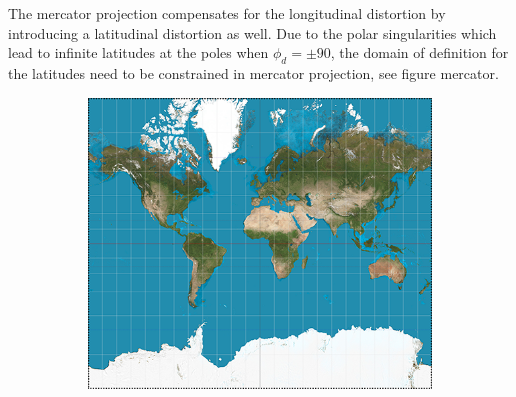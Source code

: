 The mercator projection compensates for the longitudinal distortion by introducing a latitudinal distortion as well. Due to the polar singularities which lead to infinite latitudes at the poles when $\phi_d = \pm 90$, the domain of definition for the latitudes need to be constrained in mercator projection, see figure mercator.

\begin{figure}[htbp]
    \centering
    \begin{subfigure}[bt]{0.4\textwidth}
        \includegraphics[width=\textwidth]{figures/developable_projected/mercator.png}
    \end{subfigure}
    \qquad
    \begin{subfigure}[bt]{0.15\textwidth}

\end{subfigure}
\end{figure}
